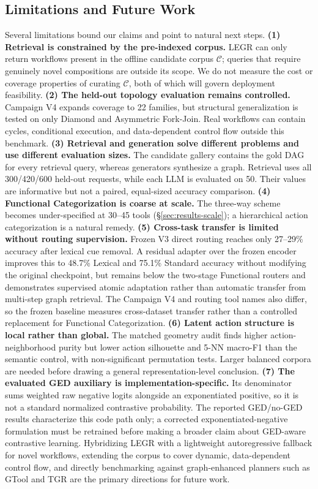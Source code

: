 \documentclass{article}
\begin{document}
\subsection*{Limitations and Future Work}
Several limitations bound our claims and point to natural next steps.
\textbf{(1) Retrieval is constrained by the pre-indexed corpus.} LEGR can only return workflows present in the offline candidate corpus $\mathcal{C}$; queries that require genuinely novel compositions are outside its scope. We do not measure the cost or coverage properties of curating $\mathcal{C}$, both of which will govern deployment feasibility.
\textbf{(2) The held-out topology evaluation remains controlled.} Campaign V4 expands coverage to 22 families, but structural generalization is tested on only Diamond and Asymmetric Fork-Join. Real workflows can contain cycles, conditional execution, and data-dependent control flow outside this benchmark.
\textbf{(3) Retrieval and generation solve different problems and use different evaluation sizes.} The candidate gallery contains the gold DAG for every retrieval query, whereas generators synthesize a graph. Retrieval uses all 300/420/600 held-out requests, while each LLM is evaluated on 50. Their values are informative but not a paired, equal-sized accuracy comparison.
\textbf{(4) Functional Categorization is coarse at scale.} The three-way scheme becomes under-specified at 30--45 tools (\S\ref{sec:results-scale}); a hierarchical action categorization is a natural remedy.
\textbf{(5) Cross-task transfer is limited without routing supervision.} Frozen V3 direct routing reaches only 27--29\% accuracy after lexical cue removal. A residual adapter over the frozen encoder improves this to 48.7\% Lexical and 75.1\% Standard accuracy without modifying the original checkpoint, but remains below the two-stage Functional routers and demonstrates supervised atomic adaptation rather than automatic transfer from multi-step graph retrieval. The Campaign V4 and routing tool names also differ, so the frozen baseline measures cross-dataset transfer rather than a controlled replacement for Functional Categorization.
\textbf{(6) Latent action structure is local rather than global.} The matched geometry audit finds higher action-neighborhood purity but lower action silhouette and 5-NN macro-F1 than the semantic control, with non-significant permutation tests. Larger balanced corpora are needed before drawing a general representation-level conclusion.
\textbf{(7) The evaluated GED auxiliary is implementation-specific.} Its denominator sums weighted raw negative logits alongside an exponentiated positive, so it is not a standard normalized contrastive probability. The reported GED/no-GED results characterize this code path only; a corrected exponentiated-negative formulation must be retrained before making a broader claim about GED-aware contrastive learning.
Hybridizing LEGR with a lightweight autoregressive fallback for novel workflows, extending the corpus to cover dynamic, data-dependent control flow, and directly benchmarking against graph-enhanced planners such as GTool and TGR are the primary directions for future work.
\end{document}
